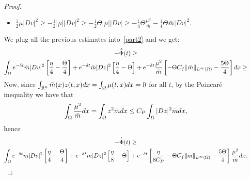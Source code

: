\documentclass[10pt,a4paper]{amsart}
\newcommand{\R}{\mathbb{R}}
\newcommand{\di}{{\rm d}}
\begin{document}
\begin{proof}
\begin{itemize}
			\item $\frac{1}{2} \mu |Dv|^2 \geq -\frac{1}{2} |\mu| |Dv|^2 \geq - \frac{1}{2} \Theta |\mu| |Dv| \geq - \frac{1}{4} \Theta \frac{\mu^2}{\bar{m}} - \frac{1}{4} \Theta \bar{m} |Dv|^2.$
		\end{itemize}
		We plug all the previous estimates into~\eqref{part2} and we get:
		\begin{multline*}
			-\dot{\tilde{\Phi}}(t) \geq \\
			\int_{\Omega} e^{-\delta t} \bar{m} |Dv|^2 \left[ \frac{\eta}{4} - \frac{\Theta}{4} \right] + e^{-\delta t} \bar{m} |Dz|^2 \left[ \frac{\eta}{4} - \Theta \right]+ e^{-\delta t} \frac{\mu^2}{\bar{m}}  \left[ - \Theta C_f \|\bar{m}\|_{L^{\infty}(\Omega)} - \frac{5 \Theta}{4} \right] \di x \geq
		\end{multline*}
		Now, since $\int_{\R^n} \bar{m}(x) z(t,x) \di x = \int_{\Omega} \mu(t,x) \di x = 0$ for all $t$, by the Poincar\'e inequality we have that
		\[
		 \int_{\Omega} \frac{\mu^2}{\bar{m}} \di x = \int_{\Omega} z^2 \bar{m} \di x \le C_P \int_{\Omega} |Dz|^2 \bar{m} \di x,
		\]
		hence
		\begin{multline*}
			-\dot{\tilde{\Phi}}(t) \geq \\
			\int_{\Omega} e^{-\delta t} \bar{m} |Dv|^2 \left[ \frac{\eta}{4} - \frac{\Theta}{4} \right] + e^{-\delta t} \bar{m} |Dz|^2 \left[ \frac{\eta}{8} - \Theta \right] + e^{-\delta t} \left[\frac{\eta}{8C_P}- \Theta C_f \|\bar{m}\|_{L^{\infty}(\Omega)} -\frac{5\Theta}{4} \right] \frac{\mu^2}{\bar{m}} \di x.
		\end{multline*}
		

\end{proof}
\end{document}
